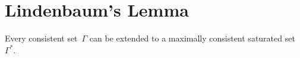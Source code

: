 \documentclass[open-logic-section]{subfiles}
\begin{document}
\section{Lindenbaum's Lemma}

\begin{lem}
Every consistent set~$\Gamma$ can be extended to a maximally
consistent saturated set~$\Gamma^*$.
\end{lem}

\end{document}

